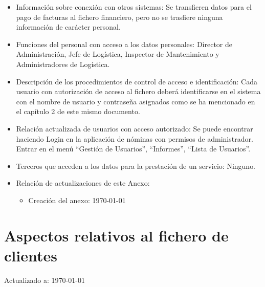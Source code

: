 \documentclass[a4paper,11pt,bibtotoc,noliststotoc]{scrbook}
\begin{document}
\begin{itemize}
\item Información sobre conexión con otros sistemas: Se transfieren datos para el pago de facturas al fichero financiero, pero no se trasfiere ninguna información de carácter personal.

\item Funciones del personal con acceso a los datos personales: Director de Administración, Jefe de Logística, Inspector de Mantenimiento y Administradores de Logística.

\item Descripción de los procedimientos de control de acceso e identificación: Cada usuario con autorización de acceso al fichero deberá identificarse en el sistema con el nombre de usuario y contraseña asignados como se ha mencionado en el capítulo 2 de este mismo documento.

\item Relación actualizada de usuarios con acceso autorizado: Se puede encontrar haciendo Login en la aplicación de nóminas con permisos de administrador. Entrar en el menú "`Gestión de Usuarios"', "`Informes"', "`Lista de Usuarios"'.

\item Terceros que acceden a los datos para la prestación de un servicio: Ninguno.

\item Relación de actualizaciones de este Anexo: 

	\begin{itemize}
	\item Creación del anexo: \today
	\end{itemize}

\end{itemize}






\section{Aspectos relativos al fichero de clientes}


Actualizado a: \today
\end{document}
